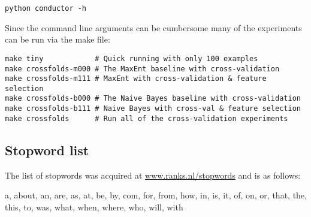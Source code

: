\documentclass[final,3p,12pt]{elsarticle}
\begin{document}
\begin{enumerate}
\begin{Verbatim}[fontsize=\footnotesize]
python conductor -h
\end{Verbatim}

Since the command line arguments can be cumbersome many of the experiments can
be run via the make file:

\begin{Verbatim}[fontsize=\footnotesize]
make tiny            # Quick running with only 100 examples
make crossfolds-m000 # The MaxEnt baseline with cross-validation
make crossfolds-m111 # MaxEnt with cross-validation & feature selection
make crossfolds-b000 # The Naive Bayes baseline with cross-validation
make crossfolds-b111 # Naive Bayes with cross-val & feature selection
make crossfolds      # Run all of the cross-validation experiments
\end{Verbatim}

\end{enumerate}

\subsection{Stopword list}
\label{ssection:stopwords}

The list of stopwords was acquired at \href{holla}{www.ranks.nl/stopwords} and
is as follows:

a, about, an, are, as, at, be, by, com, for, from, how, in, is, it, of, on, or,
that, the, this, to, was, what, when, where, who, will, with
\end{document}
